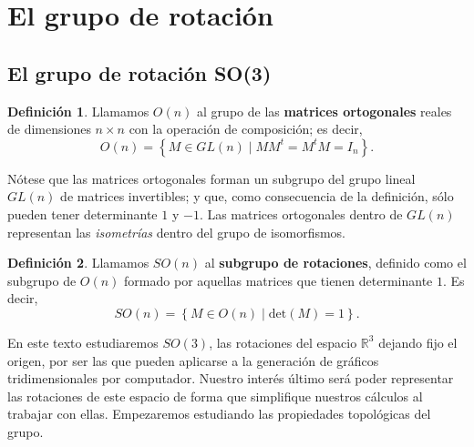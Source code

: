 \documentclass{article}
\theoremstyle{plain}
\theoremstyle{definition}
\newtheorem{definition}{Definición}
\theoremstyle{remark}
\begin{document}
\maketitle

\newpage
\tableofcontents
\newpage

\section{El grupo de rotación}
\subsection{El grupo de rotación SO(3)}

\begin{definition}
  Llamamos $O(n)$ al grupo de las \textbf{matrices ortogonales} reales
  de dimensiones $n \times n$ con la operación de composición; es
  decir,
  \[O(n) = \left\{ M \in GL(n) \mid MM^t=M^tM = I_n \right\}.\]
\end{definition}

Nótese que las matrices ortogonales forman un subgrupo del grupo
lineal $GL(n)$ de matrices invertibles; y que, como consecuencia de la definición, sólo
pueden tener determinante $1$ y $-1$. Las matrices ortogonales dentro
de $GL(n)$ representan las \textit{isometrías} dentro del grupo de isomorfismos.

\begin{definition}
  Llamamos $SO(n)$ al \textbf{subgrupo de rotaciones}, definido como
  el subgrupo de $O(n)$ formado por aquellas matrices que tienen
  determinante $1$. Es decir,
  \[SO(n) = \left\{ M \in O(n) \mid \mathrm{det}(M)=1 \right\}.\]
\end{definition}

En este texto estudiaremos $SO(3)$, las rotaciones del espacio
$\mathbb R^3$ dejando fijo el origen, por ser las que pueden aplicarse
a la generación de gráficos tridimensionales por computador. Nuestro
interés último será poder representar las rotaciones de este espacio
de forma que simplifique nuestros cálculos al trabajar con
ellas. Empezaremos estudiando las propiedades topológicas del grupo.
\end{document}
